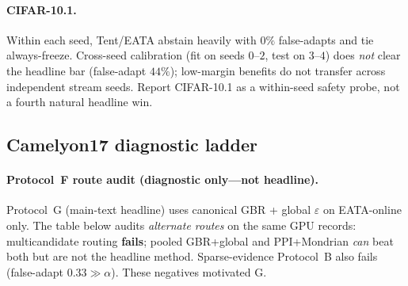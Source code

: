 \paragraph{CIFAR-10.1.}
Within each seed, Tent/EATA abstain heavily with $0\%$ false-adapts and tie always-freeze.
Cross-seed calibration (fit on seeds $0$--$2$, test on $3$--$4$) does \emph{not} clear the
headline bar (false-adapt $44\%$); low-margin benefits do not transfer across independent stream
seeds. Report CIFAR-10.1 as a within-seed safety probe, not a fourth natural headline win.

\subsection{Camelyon17 diagnostic ladder}\label{sec:camelyon-diag-short}
\begin{table}[h]\centering\small
{}
\caption{WILDS Camelyon17 ($4$ seeds): helpful-dominated; \textsc{KGA} beats freeze, not adapt.}
\label{tab:camelyon}
\end{table}

\paragraph{Protocol~F route audit (\textbf{diagnostic only}---not headline).}
Protocol~G (main-text headline) uses canonical GBR + global $\varepsilon$ on EATA-online only.
The table below audits \emph{alternate routes} on the same GPU records: multicandidate routing
\textbf{fails}; pooled GBR+global and PPI+Mondrian \emph{can} beat both but are not the headline
method. Sparse-evidence Protocol~B also fails (false-adapt $0.33\gg\alpha$). These negatives motivated G.

